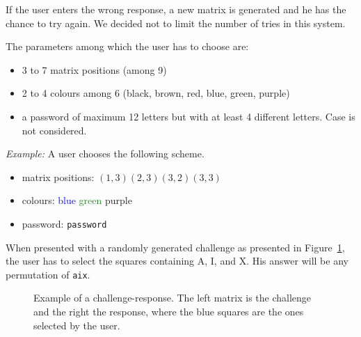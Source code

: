 \documentclass[11pt,a4paper]{article}
\begin{document}
If the user enters the wrong response, a new matrix is generated and he has the chance to try again. We decided not to limit the number of tries in this system.

The parameters among which the user has to choose are:
\begin{itemize}
\item 3 to 7 matrix positions (among 9)
\item 2 to 4 colours among 6 (black, brown, red, blue, green, purple)
\item a password of maximum 12 letters but with at least 4 different letters. Case is not considered.
\end{itemize}

\textit{Example:} A user chooses the following scheme.
\begin{itemize}
\item matrix positions: $(1,3) (2,3) (3,2) (3,3)$
\item colours: \textcolor{blue}{blue} \textcolor{ForestGreen}{green} \textcolor{RoyalPurple}{purple}
\item password: \texttt{password}
\end{itemize}
When presented with a randomly generated challenge as presented in Figure~\ref{fig:ex1}, the user has to select the squares containing A, I, and X. His answer will be any permutation of \texttt{aix}.
\begin{figure}
\centering
{}
\caption{Example of a challenge-response. The left matrix is the challenge and the right the response, where the blue squares are the ones selected by the user.}
\label{fig:ex1}
\end{figure}
\end{document}

